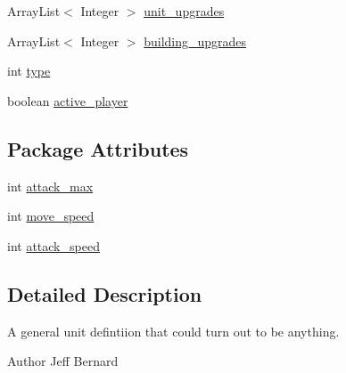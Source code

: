 \begin{DoxyCompactItemize}
\item 
ArrayList$<$ Integer $>$ \hyperlink{classrts_1_1units_1_1_unit_definition_acc95d3f7943d9a68537bcfd80663e40f}{unit\_\-upgrades}
\item 
ArrayList$<$ Integer $>$ \hyperlink{classrts_1_1units_1_1_unit_definition_ad4d0d9e8a8c96ee9e72e96cb155ee2e1}{building\_\-upgrades}
\item 
int \hyperlink{classrts_1_1units_1_1_unit_definition_a1fb7a92875b49c8b303c57dede72a197}{type}
\item 
boolean \hyperlink{classrts_1_1units_1_1_unit_definition_a19733b35d9f65bd6e4f725d6780be34c}{active\_\-player}
\end{DoxyCompactItemize}
\subsection*{Package Attributes}
\begin{DoxyCompactItemize}
\item 
int \hyperlink{classrts_1_1units_1_1_unit_definition_a3435285522cf3943dcef94aba404eba7}{attack\_\-max}
\item 
int \hyperlink{classrts_1_1units_1_1_unit_definition_aaf34756a3b832aab9de9a64540fcceeb}{move\_\-speed}
\item 
int \hyperlink{classrts_1_1units_1_1_unit_definition_a2555800befb526043f8682e87960ff12}{attack\_\-speed}
\end{DoxyCompactItemize}


\subsection{Detailed Description}
A general unit defintiion that could turn out to be anything. 

\begin{DoxyAuthor}{Author}
Jeff Bernard 
\end{DoxyAuthor}


